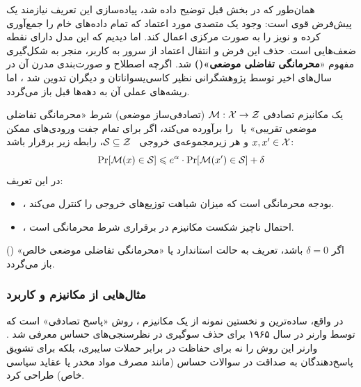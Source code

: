 همان‌طور که در بخش قبل توضیح داده شد، پیاده‌سازی این تعریف نیازمند یک پیش‌فرض قوی است: وجود یک {متصدی مورد اعتماد} که تمام داده‌های خام را جمع‌آوری کرده و نویز را به صورت مرکزی اعمال کند. اما دیدیم که این مدل دارای نقطه ضعف‌هایی است. حذف این فرض و انتقال اعتماد از سرور به کاربر، منجر به شکل‌گیری مفهوم «\textbf{محرمانگی تفاضلی موضعی»()} شد. اگرچه اصطلاح  و صورت‌بندی مدرن آن در سال‌های اخیر توسط پژوهشگرانی نظیر کاسی‌یسواناتان و دیگران تدوین شد \cite{whatcanwelearnprivatly}، اما ریشه‌های عملی آن به دهه‌ها قبل باز می‌گردد.


\begin{تعریف}
\label{def:ldp-approx-formal}
یک مکانیزم تصادفی $\mech: \Xset \to \Zset$ (تصادفی‌ساز موضعی) شرط «محرمانگی تفاضلی موضعی تقریبی» یا \ \LDP[(\al, \del)] را برآورده می‌کند، اگر برای تمام جفت ورودی‌های ممکن $x, x' \in \Xset$ و هر زیرمجموعه‌ی خروجی \ $\Sset \subseteq \Zset$، رابطه زیر برقرار باشد:
\begin{equation}
\label{eq:ldp-delta-def}
\Pr[\mech(x) \in \Sset] \le e^{\alpha} \cdot \Pr[\mech(x') \in \Sset] + \delta
\end{equation}
در این تعریف:
\begin{itemize}
    \item \al، بودجه محرمانگی است که میزان شباهت توزیع‌های خروجی را کنترل می‌کند.
    \item \del، احتمال ناچیز شکست مکانیزم در برقراری شرط محرمانگی است.
\end{itemize}
اگر $\delta = 0$ باشد، تعریف به حالت استاندارد یا «محرمانگی تفاضلی موضعی خالص» (\LDP) باز می‌گردد.
\end{تعریف}

\subsubsection{مثال‌هایی از مکانیزم و کاربرد }
در واقع، ساده‌ترین و نخستین نمونه از یک مکانیزم ، روش «پاسخ تصادفی» است که توسط وارنر در سال ۱۹۶۵ برای حذف سوگیری در نظرسنجی‌های حساس معرفی شد \cite{warner1965randomized}. وارنر این روش را نه برای حفاظت در برابر حملات سایبری، بلکه برای تشویق پاسخ‌دهندگان به صداقت در سوالات حساس (مانند مصرف مواد مخدر یا عقاید سیاسی خاص) طراحی کرد.
    
